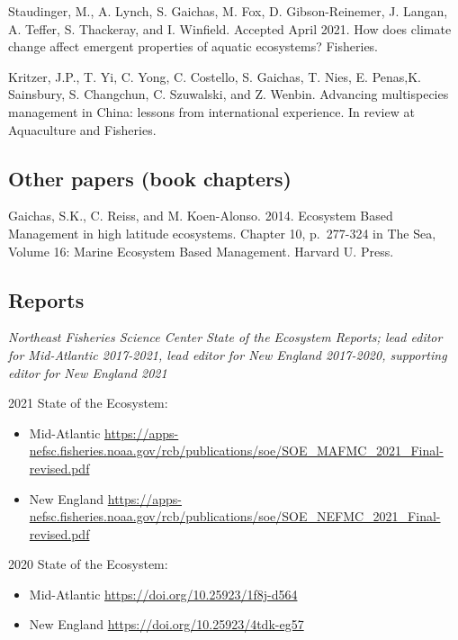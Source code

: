 \documentclass[11pt, a4paper]{awesome-cv}
\providecommand{\tightlist}{%
	\setlength{\itemsep}{0pt}\setlength{\parskip}{0pt}}
\begin{document}
Staudinger, M., A. Lynch, S. Gaichas, M. Fox, D. Gibson-Reinemer, J.
Langan, A. Teffer, S. Thackeray, and I. Winfield. Accepted April 2021.
How does climate change affect emergent properties of aquatic
ecosystems? Fisheries.

Kritzer, J.P., T. Yi, C. Yong, C. Costello, S. Gaichas, T. Nies, E.
Penas,K. Sainsbury, S. Changchun, C. Szuwalski, and Z. Wenbin. Advancing
multispecies management in China: lessons from international experience.
In review at Aquaculture and Fisheries.

\hypertarget{other-papers-book-chapters}{%
\subsection{Other papers (book
chapters)}\label{other-papers-book-chapters}}

Gaichas, S.K., C. Reiss, and M. Koen-Alonso. 2014. Ecosystem Based
Management in high latitude ecosystems. Chapter 10, p.~277-324 in The
Sea, Volume 16: Marine Ecosystem Based Management. Harvard U. Press.

\hypertarget{reports}{%
\subsection{Reports}\label{reports}}

\emph{Northeast Fisheries Science Center State of the Ecosystem Reports;
lead editor for Mid-Atlantic 2017-2021, lead editor for New England
2017-2020, supporting editor for New England 2021}

2021 State of the Ecosystem:

\begin{itemize}
\tightlist
\item
  Mid-Atlantic
  \url{https://apps-nefsc.fisheries.noaa.gov/rcb/publications/soe/SOE_MAFMC_2021_Final-revised.pdf}
\item
  New England
  \url{https://apps-nefsc.fisheries.noaa.gov/rcb/publications/soe/SOE_NEFMC_2021_Final-revised.pdf}
\end{itemize}

2020 State of the Ecosystem:

\begin{itemize}
\tightlist
\item
  Mid-Atlantic \url{https://doi.org/10.25923/1f8j-d564}
\item
  New England \url{https://doi.org/10.25923/4tdk-eg57}
\end{itemize}
\end{document}
